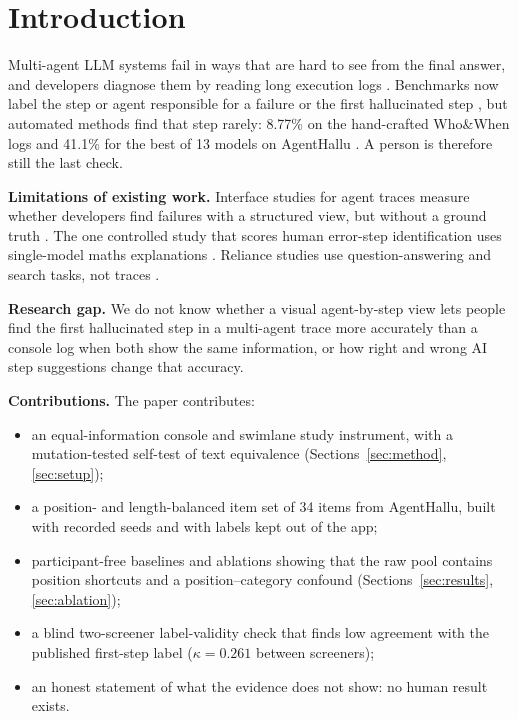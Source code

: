 \documentclass[conference]{IEEEtran}
\begin{document}
\section{Introduction}
Multi-agent LLM systems fail in ways that are hard to see from the final answer, and developers diagnose them by reading long execution logs \cite{cemri2025mast,bouzenia2025trajectories}. Benchmarks now label the step or agent responsible for a failure \cite{zhang2025whowhen,chen2026elephant} or the first hallucinated step \cite{liu2026agenthallu}, but automated methods find that step rarely: 8.77\% on the hand-crafted Who\&When logs \cite{zhang2025whowhen} and 41.1\% for the best of 13 models on AgentHallu \cite{liu2026agenthallu}. A person is therefore still the last check.

\textbf{Limitations of existing work.} Interface studies for agent traces measure whether developers find failures with a structured view, but without a ground truth \cite{sheng2026dills}. The one controlled study that scores human error-step identification uses single-model maths explanations \cite{zhou2026verification}. Reliance studies use question-answering and search tasks, not traces \cite{kim2025reliance,spatharioti2025search}.

\textbf{Research gap.} We do not know whether a visual agent-by-step view lets people find the first hallucinated step in a multi-agent trace more accurately than a console log when both show the same information, or how right and wrong AI step suggestions change that accuracy.

\textbf{Contributions.} The paper contributes:
\begin{itemize}
\item an equal-information console and swimlane study instrument, with a mutation-tested self-test of text equivalence (Sections~\ref{sec:method}, \ref{sec:setup});
\item a position- and length-balanced item set of 34 items from AgentHallu, built with recorded seeds and with labels kept out of the app;
\item participant-free baselines and ablations showing that the raw pool contains position shortcuts and a position--category confound (Sections~\ref{sec:results}, \ref{sec:ablation});
\item a blind two-screener label-validity check that finds low agreement with the published first-step label ($\kappa=0.261$ between screeners);
\item an honest statement of what the evidence does not show: no human result exists.
\end{itemize}
\end{document}
